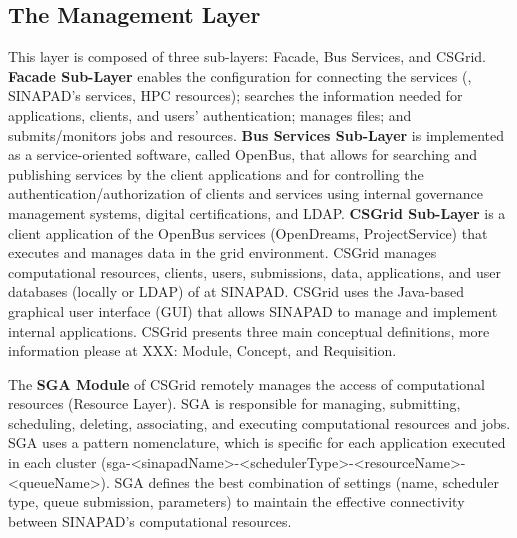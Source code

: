 \vspace{-5px}
\subsection{The Management Layer}

This layer is composed of three sub-layers: Facade, Bus Services, and CSGrid. \textbf{Facade Sub-Layer} enables the configuration for connecting the services (\system, SINAPAD’s services, HPC resources); searches the information needed for applications, clients, and users’ authentication; manages files; and submits/monitors jobs and resources. \textbf{Bus Services Sub-Layer} is implemented as a service-oriented software, called OpenBus, that allows for searching and publishing services by the client applications and for controlling the authentication/authorization of clients and services using internal governance management systems, digital certifications, and LDAP. \textbf{CSGrid Sub-Layer} is a client application of the OpenBus services (OpenDreams, ProjectService) that executes and manages data in the grid environment. CSGrid manages computational resources, clients, users, submissions, data, applications, and user databases (locally or LDAP) of \system at SINAPAD. CSGrid uses the Java-based graphical user interface (GUI) that allows SINAPAD to manage and implement internal applications. CSGrid presents three main conceptual definitions, more information please at XXX: Module, Concept, and Requisition. 

The \textbf{SGA Module} of CSGrid remotely manages the access of computational resources (Resource Layer). SGA is responsible for managing, submitting, scheduling, deleting, associating, and executing computational resources and jobs. SGA uses a pattern nomenclature, which is specific for each application executed in each cluster (sga-<sinapadName>-<schedulerType>-<resourceName>-<queueName>). SGA defines the best combination of settings (name, scheduler type, queue submission, parameters) to maintain the effective connectivity between SINAPAD’s computational resources.

